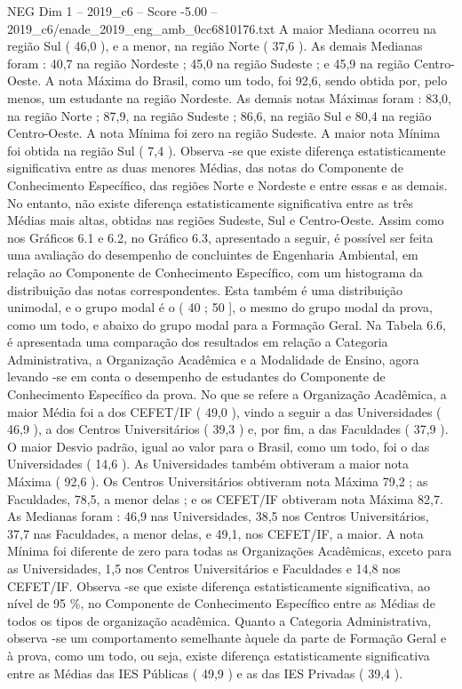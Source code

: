 \begin{textsample}{NEG Dim 1 – 2019\_c6 – Score -5.00 – 2019\_c6/enade\_2019\_eng\_amb\_0cc6810176.txt}
A maior Mediana ocorreu na região Sul ( 46,0 ), e a menor, na região Norte ( 37,6 ).
As demais Medianas foram : 40,7 na região Nordeste ; 45,0 na região Sudeste ; e 45,9 na região Centro-Oeste.
A nota Máxima do Brasil, como um todo, foi 92,6, sendo obtida por, pelo menos, um estudante na região Nordeste.
As demais notas Máximas foram : 83,0, na região Norte ; 87,9, na região Sudeste ; 86,6, na região Sul e 80,4 na região Centro-Oeste.
A nota Mínima foi zero na região Sudeste.
A maior nota Mínima foi obtida na região Sul ( 7,4 ).
Observa -se que existe diferença estatisticamente significativa entre as duas menores Médias, das notas do Componente de Conhecimento Específico, das regiões Norte e Nordeste e entre essas e as demais.
No entanto, não existe diferença estatisticamente significativa entre as três Médias mais altas, obtidas nas regiões Sudeste, Sul e Centro-Oeste.
Assim como nos Gráficos 6.1 e 6.2, no Gráfico 6.3, apresentado a seguir, é possível ser feita uma avaliação do desempenho de concluintes de Engenharia Ambiental, em relação ao Componente de Conhecimento Específico, com um histograma da distribuição das notas correspondentes.
Esta também é uma distribuição unimodal, e o grupo modal é o ( 40 ; 50 ], o mesmo do grupo modal da prova, como um todo, e abaixo do grupo modal para a Formação Geral.
Na Tabela 6.6, é apresentada uma comparação dos resultados em relação a Categoria Administrativa, a Organização Acadêmica e a Modalidade de Ensino, agora levando -se em conta o desempenho de estudantes do Componente de Conhecimento Específico da prova.
No que se refere a Organização Acadêmica, a maior Média foi a dos CEFET/IF ( 49,0 ), vindo a seguir a das Universidades ( 46,9 ), a dos Centros Universitários ( 39,3 ) e, por fim, a das Faculdades ( 37,9 ).
O maior Desvio padrão, igual ao valor para o Brasil, como um todo, foi o das Universidades ( 14,6 ).
As Universidades também obtiveram a maior nota Máxima ( 92,6 ).
Os Centros Universitários obtiveram nota Máxima 79,2 ; as Faculdades, 78,5, a menor delas ; e os CEFET/IF obtiveram nota Máxima 82,7.
As Medianas foram : 46,9 nas Universidades, 38,5 nos Centros Universitários, 37,7 nas Faculdades, a menor delas, e 49,1, nos CEFET/IF, a maior.
A nota Mínima foi diferente de zero para todas as Organizações Acadêmicas, exceto para as Universidades, 1,5 nos Centros Universitários e Faculdades e 14,8 nos CEFET/IF.
Observa -se que existe diferença estatisticamente significativa, ao nível de 95 \%, no Componente de Conhecimento Específico entre as Médias de todos os tipos de organização acadêmica.
Quanto a Categoria Administrativa, observa -se um comportamento semelhante àquele da parte de Formação Geral e à prova, como um todo, ou seja, existe diferença estatisticamente significativa entre as Médias das IES Públicas ( 49,9 ) e as das IES Privadas ( 39,4 ).

\end{textsample}
